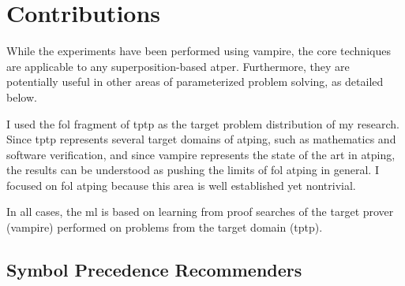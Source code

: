 

\section{Contributions}

While the experiments have been performed using \gls{vampire},
the core techniques are applicable to any \gls{superposition}-based \gls{atper}.
Furthermore, they are potentially useful in other areas of parameterized problem solving, as detailed below.

I used the \gls{fol} fragment of \gls{tptp} as the target problem distribution of my research.
Since \gls{tptp} represents several target domains of \gls{atping},
such as mathematics and software verification,
and since \gls{vampire} represents the state of the art in \gls{atping},
the results can be understood as pushing the limits of \gls{fol} \gls{atping} in general.
I focused on \gls{fol} \gls{atping} because this area is well established yet nontrivial.

In all cases, the \gls{ml} is based on learning from proof searches of the target prover (\gls{vampire}) performed on problems from the target domain (\gls{tptp}).

\subsection{Symbol Precedence Recommenders}
\label{sec:contrib:SymbolPrecedenceRecommenders}

